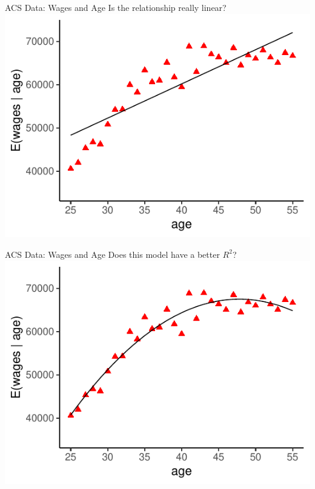 \documentclass{./../div_teaching_slides}
\begin{document}
\begin{frame}{ACS Data: Wages and Age}
\centering Is the relationship really linear? \\ \vspace{1em}
\includegraphics{./../../output/scatter_age_wage_lfit.pdf}
\end{frame}

\begin{frame}{ACS Data: Wages and Age}
\centering Does this model have a better $R^2$? \\ \vspace{1em}
\includegraphics{./../../output/scatter_age_wage_qfit.pdf}
\end{frame}
\end{document}
